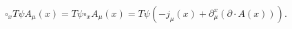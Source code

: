 \begin{equation}
\square_{x}T\psi A_{\mu}(x)=T\psi\square_{x}A_{\mu}(x)=T\psi(-j_{\mu
}(x)+\partial_{\mu}^{x}(\partial\cdot A(x))).
\end{equation}

